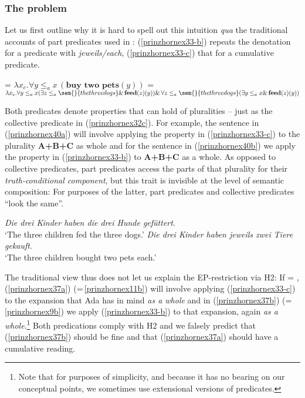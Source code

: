 \documentclass[output=paper,colorlinks,citecolor=brown,
]{langscibook}
\begin{document}
\subsubsection{The problem}

Let us first outline why it is hard to spell out this intuition \textit{qua} the traditional accounts of part predicates used in : (\ref{prinzhornex33-b}) repeats the denotation for a 
 predicate with \textit{jeweils/each}, (\ref{prinzhornex33-c}) that for a cumulative predicate.

\ea \label{prinzhornexden}
\ea {} = $\lambda x_{e}. \forall y \le_{a} x \,(\textbf{buy  two pets}(y))$\label{prinzhornex33-b}
\ex	 {} = $\lambda x_{e}. \forall y \le_{a} x (\exists z \le_{a} \sem{}{the three dogs} \&\, \textbf{feed}(z)(y)) \&\, \forall z \le_{a} \sem{}{the three dogs} (\exists y \le_{a} x \& \,\textbf{feed}(z)(y))$ \label{prinzhornex33-c}
\z\z

Both predicates denote properties that can hold of pluralities -- just as the collective predicate in (\ref{prinzhornex32c}). For example, the sentence in (\ref{prinzhornex40a}) will involve applying the property in (\ref{prinzhornex33-c}) to the plurality \textbf{A+B+C} as whole and  for the sentence in (\ref{prinzhornex40b}) we apply the property in (\ref{prinzhornex33-b}) to \textbf{A+B+C} as a whole. As opposed to collective predicates, part predicates access the parts of that plurality for their \textit{truth-conditional component}, but this trait is invisible at the level of semantic composition: For purposes of the latter, part predicates and collective predicates “look the same”. 



\ea \label{prinzhornex40}
\ea \textit{Die drei Kinder haben die drei Hunde gefüttert}.\\
`The three children fed the three dogs.' \label{prinzhornex40a}
\ex \textit{Die drei Kinder haben jeweils zwei Tiere gekauft}.\\
`The three children bought two pets each.' \label{prinzhornex40b}
\z\z

The traditional view thus does not let us explain the EP-restriction via H2: If  = ,  (\ref{prinzhornex37a})  (=\,\ref{prinzhornex11b}) will involve applying (\ref{prinzhornex33-c}) to the expansion that Ada has in mind \textit{as a whole} and in (\ref{prinzhornex37b}) (=\,\ref{prinzhornex9b}) we apply (\ref{prinzhornex33-b}) to that expansion, again \textit{as a whole}.\footnote{Note that for purposes of simplicity, and because it has no bearing on our conceptual points, we sometimes use extensional versions of predicates.} Both  predications comply with H2 and we falsely predict that (\ref{prinzhornex37b}) should be fine and that (\ref{prinzhornex37a}) should have a cumulative reading.
\end{document}
